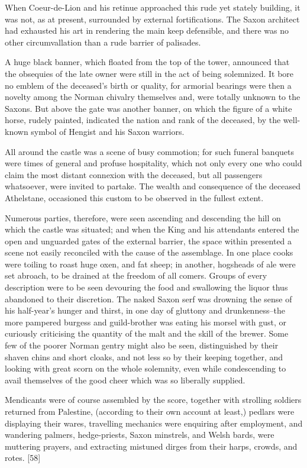 When Coeur-de-Lion and his retinue approached this rude yet stately
building, it was not, as at present, surrounded by external
fortifications. The Saxon architect had exhausted his art in rendering
the main keep defensible, and there was no other circumvallation than a
rude barrier of palisades.

A huge black banner, which floated from the top of the tower, announced
that the obsequies of the late owner were still in the act of being
solemnized. It bore no emblem of the deceased's birth or quality, for
armorial bearings were then a novelty among the Norman chivalry
themselves and, were totally unknown to the Saxons. But above the gate
was another banner, on which the figure of a white horse, rudely
painted, indicated the nation and rank of the deceased, by the
well-known symbol of Hengist and his Saxon warriors.

All around the castle was a scene of busy commotion; for such funeral
banquets were times of general and profuse hospitality, which not only
every one who could claim the most distant connexion with the deceased,
but all passengers whatsoever, were invited to partake. The wealth and
consequence of the deceased Athelstane, occasioned this custom to be
observed in the fullest extent.

Numerous parties, therefore, were seen ascending and descending the hill
on which the castle was situated; and when the King and his attendants
entered the open and unguarded gates of the external barrier, the space
within presented a scene not easily reconciled with the cause of the
assemblage. In one place cooks were toiling to roast huge oxen, and fat
sheep; in another, hogsheads of ale were set abroach, to be drained at
the freedom of all comers. Groups of every description were to be seen
devouring the food and swallowing the liquor thus abandoned to their
discretion. The naked Saxon serf was drowning the sense of his
half-year's hunger and thirst, in one day of gluttony and
drunkenness--the more pampered burgess and guild-brother was eating his
morsel with gust, or curiously criticising the quantity of the malt and
the skill of the brewer. Some few of the poorer Norman gentry might also
be seen, distinguished by their shaven chins and short cloaks, and not
less so by their keeping together, and looking with great scorn on the
whole solemnity, even while condescending to avail themselves of the
good cheer which was so liberally supplied.

Mendicants were of course assembled by the score, together with
strolling soldiers returned from Palestine, (according to their own
account at least,) pedlars were displaying their wares, travelling
mechanics were enquiring after employment, and wandering palmers,
hedge-priests, Saxon minstrels, and Welsh bards, were muttering prayers,
and extracting mistuned dirges from their harps, crowds, and rotes.
{[}58{]}

